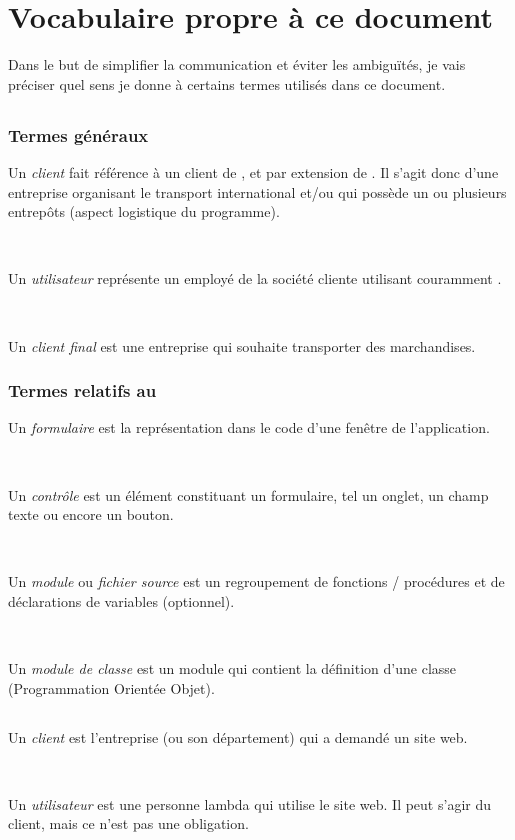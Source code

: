 \chapter{Vocabulaire propre à ce document}
Dans le but de simplifier la communication et éviter les ambiguïtés, je vais préciser quel sens je donne à certains termes utilisés dans ce document.

\section{\solulog}
\subsection{Termes généraux}
Un \emph{client} fait référence à un client de \integrale, et par extension de \solulog. Il s'agit donc d'une entreprise organisant le transport international et/ou qui possède un ou plusieurs entrepôts (aspect logistique du programme).

~

Un \emph{utilisateur} représente un employé de la société cliente utilisant couramment \integrale.

~

Un \emph{client final} est une entreprise qui souhaite transporter des marchandises.

\subsection{Termes relatifs au \vb}
Un \emph{formulaire} est la représentation dans le code d'une fenêtre de l'application.

~

Un \emph{contrôle} est un élément constituant un formulaire, tel un onglet, un champ texte ou encore un bouton.

~

Un \emph{module} ou \emph{fichier source} est un regroupement de fonctions / procédures et de déclarations de variables (optionnel).

~

Un \emph{module de classe} est un module qui contient la définition d'une classe (Programmation Orientée Objet).

\section{\fidit}
Un \emph{client} est l'entreprise (ou son département) qui a demandé un site web.

~

Un \emph{utilisateur} est une personne lambda qui utilise le site web. Il peut s'agir du client, mais ce n'est pas une obligation.
